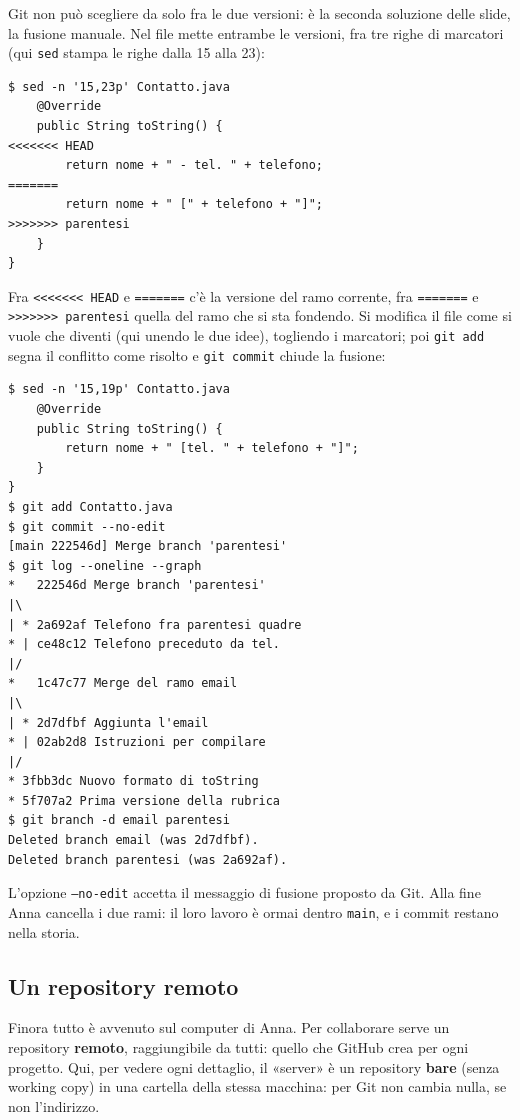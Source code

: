 Git non può scegliere da solo fra le due versioni: è la seconda soluzione delle slide, la fusione manuale. Nel file mette
entrambe le versioni, fra tre righe di marcatori (qui \texttt{sed} stampa le righe dalla 15 alla 23):

\begin{lstlisting}[style=shell, name=Terminale di Anna, deletestring={[b]'}, deletekeywords={java}]
$ sed -n '15,23p' Contatto.java
    @Override
    public String toString() {
<<<<<<< HEAD
        return nome + " - tel. " + telefono;
=======
        return nome + " [" + telefono + "]";
>>>>>>> parentesi
    }
}
\end{lstlisting}

Fra \texttt{<<<<<<< HEAD} e \texttt{=======} c'è la versione del ramo corrente, fra \texttt{=======} e
\texttt{>>>>>>> parentesi} quella del ramo che si sta fondendo. Si modifica il file come si vuole che diventi
(qui unendo le due idee), togliendo i marcatori; poi \texttt{git add} segna il conflitto come risolto e
\texttt{git commit} chiude la fusione:

\begin{lstlisting}[style=shell, name=Terminale di Anna, deletestring={[b]'}, deletekeywords={java}]
$ sed -n '15,19p' Contatto.java
    @Override
    public String toString() {
        return nome + " [tel. " + telefono + "]";
    }
}
$ git add Contatto.java
$ git commit --no-edit
[main 222546d] Merge branch 'parentesi'
$ git log --oneline --graph
*   222546d Merge branch 'parentesi'
|\
| * 2a692af Telefono fra parentesi quadre
* | ce48c12 Telefono preceduto da tel.
|/
*   1c47c77 Merge del ramo email
|\
| * 2d7dfbf Aggiunta l'email
* | 02ab2d8 Istruzioni per compilare
|/
* 3fbb3dc Nuovo formato di toString
* 5f707a2 Prima versione della rubrica
$ git branch -d email parentesi
Deleted branch email (was 2d7dfbf).
Deleted branch parentesi (was 2a692af).
\end{lstlisting}

L'opzione \texttt{--no-edit} accetta il messaggio di fusione proposto da Git. Alla fine Anna cancella i due rami: il
loro lavoro è ormai dentro \texttt{main}, e i commit restano nella storia.

\subsection{Un repository remoto}

Finora tutto è avvenuto sul computer di Anna. Per collaborare serve un repository \textbf{remoto}, raggiungibile da
tutti: quello che GitHub crea per ogni progetto. Qui, per vedere ogni dettaglio, il «server» è un repository
\textbf{bare} (senza working copy) in una cartella della stessa macchina: per Git non cambia nulla, se non l'indirizzo.

